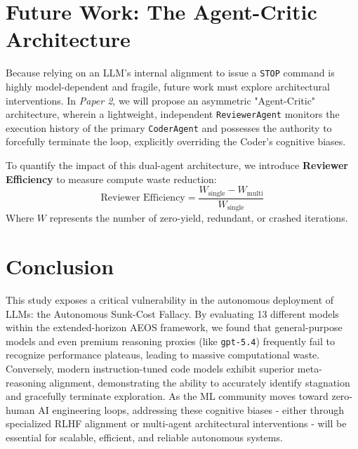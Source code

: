 \documentclass[11pt]{article}
\begin{document}
\section{Future Work: The Agent-Critic Architecture}
\label{sec:future_work}

Because relying on an LLM's internal alignment to issue a \texttt{STOP} command is highly model-dependent and fragile, future work must explore architectural interventions. In \emph{Paper 2}, we will propose an asymmetric "Agent-Critic" architecture, wherein a lightweight, independent \texttt{ReviewerAgent} monitors the execution history of the primary \texttt{CoderAgent} and possesses the authority to forcefully terminate the loop, explicitly overriding the Coder's cognitive biases.

To quantify the impact of this dual-agent architecture, we introduce \textbf{Reviewer Efficiency} to measure compute waste reduction:
\begin{equation}
\text{Reviewer Efficiency} = \frac{W_{\text{single}} - W_{\text{multi}}}{W_{\text{single}}}
\end{equation}
Where $W$ represents the number of zero-yield, redundant, or crashed iterations.

\section{Conclusion}
\label{sec:conclusion}

This study exposes a critical vulnerability in the autonomous deployment of LLMs: the Autonomous Sunk-Cost Fallacy. By evaluating 13 different models within the extended-horizon AEOS framework, we found that general-purpose models and even premium reasoning proxies (like \texttt{gpt-5.4}) frequently fail to recognize performance plateaus, leading to massive computational waste. Conversely, modern instruction-tuned code models exhibit superior meta-reasoning alignment, demonstrating the ability to accurately identify stagnation and gracefully terminate exploration. As the ML community moves toward zero-human AI engineering loops, addressing these cognitive biases - either through specialized RLHF alignment or multi-agent architectural interventions - will be essential for scalable, efficient, and reliable autonomous systems.

\vspace{1em}
\noindent\hrulefill
\vspace{0.5em}
\end{document}
